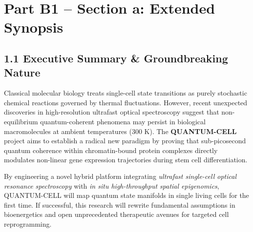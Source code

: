 \documentclass[11pt,a4paper]{article}
\begin{document}
\section*{Part B1 -- Section a: Extended Synopsis}

\subsection*{1.1 Executive Summary \& Groundbreaking Nature}
Classical molecular biology treats single-cell state transitions as purely stochastic chemical reactions governed by thermal fluctuations. However, recent unexpected discoveries in high-resolution ultrafast optical spectroscopy suggest that non-equilibrium quantum-coherent phenomena may persist in biological macromolecules at ambient temperatures ($300\text{ K}$). The \textbf{QUANTUM-CELL} project aims to establish a radical new paradigm by proving that sub-picosecond quantum coherence within chromatin-bound protein complexes directly modulates non-linear gene expression trajectories during stem cell differentiation.

By engineering a novel hybrid platform integrating \textit{ultrafast single-cell optical resonance spectroscopy} with \textit{in situ high-throughput spatial epigenomics}, QUANTUM-CELL will map quantum state manifolds in single living cells for the first time. If successful, this research will rewrite fundamental assumptions in bioenergetics and open unprecedented therapeutic avenues for targeted cell reprogramming.
\end{document}
